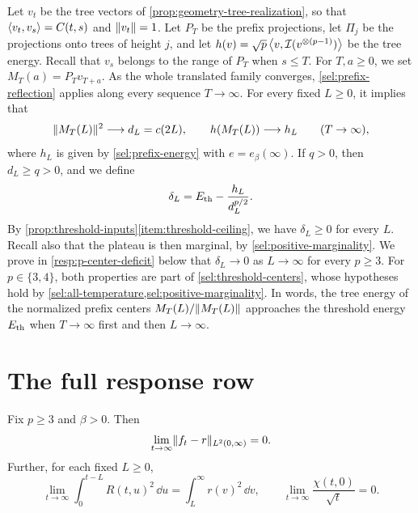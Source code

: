 Let $v_t$ be the tree vectors of \cref{prop:geometry-tree-realization}, so that $\left\langle v_t,v_s\right\rangle=C(t,s)$ and $\lVert v_t\rVert=1$. Let $P_T$ be the prefix projections, let $\Pi_j$ be the projections onto trees of height $j$, and let $h(v)=\sqrt p\left\langle v,\mathcal I(v^{\otimes(p-1)})\right\rangle$ be the tree energy. Recall that $v_s$ belongs to the range of $P_T$ when $s\le T$. For $T,a\ge0$, we set $M_T(a)=P_Tv_{T+a}$. As the whole translated family converges, \cref{sel:prefix-reflection} applies along every sequence $T\to\infty$. For every fixed $L\ge0$, it implies that
\begin{equation}
 \lVert M_T(L)\rVert^2\longrightarrow d_L=c(2L),\qquad
 h(M_T(L))\longrightarrow h_L\qquad(T\to\infty),
 \label{resp:prefix-norm}
\end{equation}
where $h_L$ is given by \eqref{sel:prefix-energy} with $e=e_\beta(\infty)$. If $q>0$, then $d_L\ge q>0$, and we define
\[
 \delta_L=E_{\mathrm{th}}-\frac{h_L}{d_L^{p/2}}.
\]
By \cref{prop:threshold-inputs}\ref{item:threshold-ceiling}, we have $\delta_L\ge0$ for every $L$. Recall also that the plateau is then marginal, by \cref{sel:positive-marginality}. We prove in \eqref{resp:p-center-deficit} below that $\delta_L\to0$ as $L\to\infty$ for every $p\ge3$. For $p\in\{3,4\}$, both properties are part of \cref{sel:threshold-centers}, whose hypotheses hold by \cref{sel:all-temperature,sel:positive-marginality}. In words, the tree energy of the normalized prefix centers $M_T(L)/\lVert M_T(L)\rVert$ approaches the threshold energy $E_{\mathrm{th}}$ when $T\to\infty$ first and then $L\to\infty$.

\section{The full response row}\label{sec:resp-full-row}

\begin{theorem}
\label{resp:strong-row}
Fix $p\ge3$ and $\beta>0$. Then
\begin{equation}
 \lim_{t\to\infty}\lVert f_t-r\rVert_{L^2(0,\infty)}=0.
 \label{resp:strong-row-limit}
\end{equation}
Further, for each fixed $L\ge0$,
\begin{equation}
 \lim_{t\to\infty}\int_0^{t-L}R(t,u)^2\,\dd u=\int_L^\infty r(v)^2\,\dd v,
 \qquad \lim_{t\to\infty}\frac{\chi(t,0)}{\sqrt t}=0.
 \label{resp:square-tail}
\end{equation}
\end{theorem}

